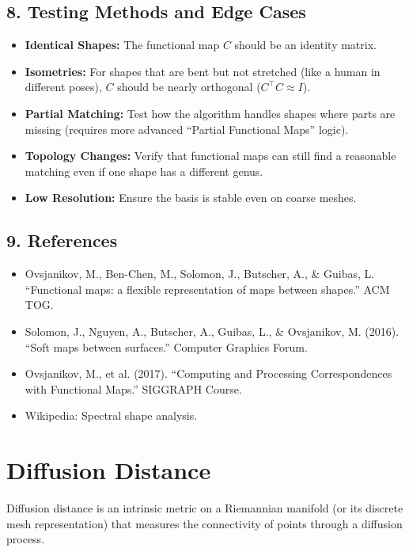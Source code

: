 \subsection{8. Testing Methods and Edge Cases}

\begin{itemize}
    \item \textbf{Identical Shapes:} The functional map $C$ should be an identity matrix.
    \item \textbf{Isometries:} For shapes that are bent but not stretched (like a human in different poses), $C$ should be nearly orthogonal ($C^\top C \approx I$).
    \item \textbf{Partial Matching:} Test how the algorithm handles shapes where parts are missing (requires more advanced ``Partial Functional Maps'' logic).
    \item \textbf{Topology Changes:} Verify that functional maps can still find a reasonable matching even if one shape has a different genus.
    \item \textbf{Low Resolution:} Ensure the basis is stable even on coarse meshes.
\end{itemize}

\subsection{9. References}

\begin{itemize}
    \item Ovsjanikov, M., Ben-Chen, M., Solomon, J., Butscher, A., \& Guibas, L. \cite{ovsjanikov2012} ``Functional maps: a flexible representation of maps between shapes.'' ACM TOG.
    \item Solomon, J., Nguyen, A., Butscher, A., Guibas, L., \& Ovsjanikov, M. (2016). ``Soft maps between surfaces.'' Computer Graphics Forum.
    \item Ovsjanikov, M., et al. (2017). ``Computing and Processing Correspondences with Functional Maps.'' SIGGRAPH Course.
    \item Wikipedia: Spectral shape analysis.
\end{itemize}

\section{Diffusion Distance}
\label{sec:diffusion_distance}

Diffusion distance is an intrinsic metric on a Riemannian manifold (or its discrete mesh representation) that measures the connectivity of points through a diffusion process\cite{coifman2006}.

